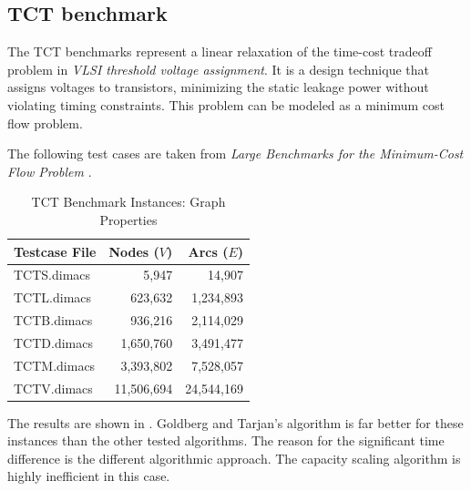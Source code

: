\subsection{TCT benchmark}

The TCT benchmarks represent a linear relaxation of the time-cost tradeoff problem in \textit{VLSI threshold voltage assignment}. It is a design technique that assigns voltages to transistors, minimizing the static leakage power without violating timing constraints. This problem can be modeled as a minimum cost flow problem.

The following test cases are taken from \textit{Large Benchmarks for the Minimum-Cost Flow Problem} \cite{bonnmcf}.

\begin{table}[htbp]
    \centering
    \caption{TCT Benchmark Instances: Graph Properties}
    \label{tab:tct_graph_sizes}
    \begin{tabular}{lrr}
        \toprule
        \textbf{Testcase File} & \textbf{Nodes ($V$)} & \textbf{Arcs ($E$)} \\
        \midrule
        TCTS.dimacs & 5,947 & 14,907 \\
        TCTL.dimacs & 623,632 & 1,234,893 \\
        TCTB.dimacs & 936,216 & 2,114,029 \\
        TCTD.dimacs & 1,650,760 & 3,491,477 \\
        TCTM.dimacs & 3,393,802 & 7,528,057 \\
        TCTV.dimacs & 11,506,694 & 24,544,169 \\
        \bottomrule
    \end{tabular}
\end{table}

The results are shown in . Goldberg and Tarjan's algorithm is far better for these instances than the other tested algorithms. The reason for the significant time difference is the different algorithmic approach. The capacity scaling algorithm is highly inefficient in this case.

